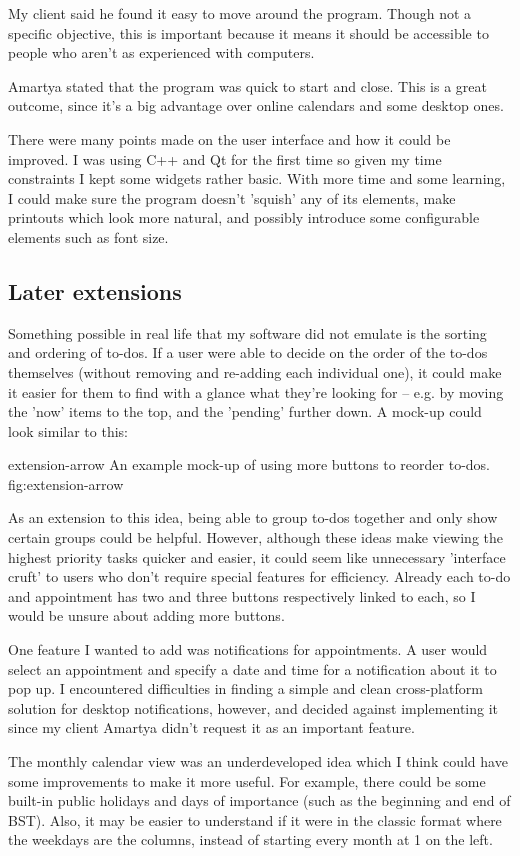 My client said he found it easy to move around the program. Though not a
specific objective, this is important because it means it should be accessible
to people who aren't as experienced with computers.

Amartya stated that the program was quick to start and close. This is a great
outcome, since it's a big advantage over online calendars and some desktop ones.

There were many points made on the user interface and how it could be improved.
I was using C++ and Qt for the first time so given my time constraints I kept
some widgets rather basic. With more time and some learning, I could make sure
the program doesn't 'squish' any of its elements, make printouts which look more
natural, and possibly introduce some configurable elements such as font size.


\subsection{Later extensions}

Something possible in real life that my software did not emulate is the sorting
and ordering of to-dos. If a user were able to decide on the order of the to-dos
themselves (without removing and re-adding each individual one), it could make
it easier for them to find with a glance what they're looking for -- e.g. by
moving the 'now' items to the top, and the 'pending' further down. A mock-up
could look similar to this:

\addsmallfigure
    {extension-arrow}
    {An example mock-up of using more buttons to reorder to-dos.}
    {fig:extension-arrow}

As an extension to this idea, being able to group to-dos together and only show
certain groups could be helpful. However, although these ideas make viewing the
highest priority tasks quicker and easier, it could seem like unnecessary
'interface cruft' to users who don't require special features for efficiency.
Already each to-do and appointment has two and three buttons respectively linked
to each, so I would be unsure about adding more buttons.

One feature I wanted to add was notifications for appointments. A user would
select an appointment and specify a date and time for a notification about
it to pop up. I encountered difficulties in finding a simple and clean
cross-platform solution for desktop notifications, however, and decided against
implementing it since my client Amartya didn't request it as an important
feature.

The monthly calendar view was an underdeveloped idea which I think could have
some improvements to make it more useful. For example, there could be some
built-in public holidays and days of importance (such as the beginning and end
of BST). Also, it may be easier to understand if it were in the classic format
where the weekdays are the columns, instead of starting every month at 1 on the
left.
